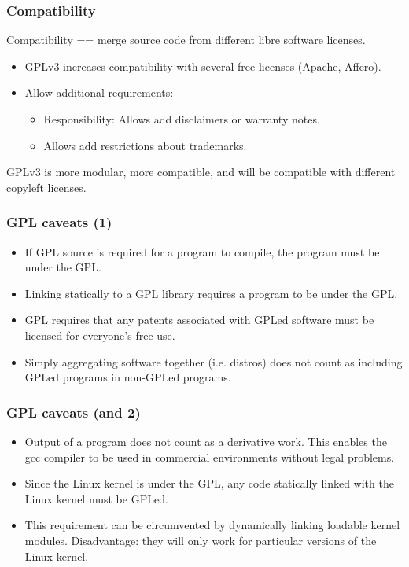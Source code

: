 
\begin{frame}
\frametitle{Compatibility}

Compatibility == merge source code from different libre software licenses.

\begin{itemize}
\item GPLv3 increases compatibility with several free licenses (Apache, Affero).
\item Allow additional requirements:
\begin{itemize}
\item Responsibility: Allows add disclaimers or warranty notes.
\item Allows add restrictions about trademarks.
\end{itemize}
\end{itemize}

GPLv3 is more modular, more compatible, and will be compatible with different copyleft licenses.

\end{frame}


\begin{frame}
\frametitle{GPL caveats (1)}

\begin{itemize}
\item If GPL source is required for a program to compile, the program must be under the GPL. 
\item Linking statically to a GPL library requires a program to be under the GPL.
\item GPL requires that any patents associated with GPLed software must be licensed for everyone's free use.
\item Simply aggregating software together (i.e. distros) does not count as including GPLed programs in non-GPLed programs.
\end{itemize}
\end{frame}


\begin{frame}
\frametitle{GPL caveats (and 2)}

\begin{itemize}
\item Output of a program does not count as a derivative work. This enables the gcc compiler to be used in commercial environments without legal problems.
\item Since the Linux kernel is under the GPL, any code statically linked with the Linux kernel must be GPLed. 
\item This requirement can be circumvented by dynamically linking loadable kernel modules. Disadvantage: they will only work for particular versions of the Linux kernel.
\end{itemize}

\end{frame}


